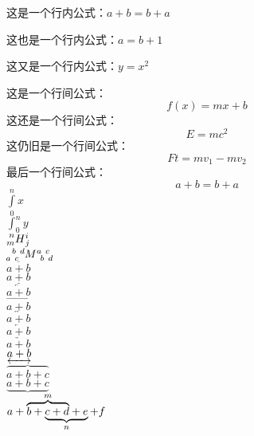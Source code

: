 \documentclass[UTF8, fontset=ubuntu]{ctexart}
\begin{document}
	这是一个行内公式：$a+b=b+a$\par
	这也是一个行内公式：\( a=b+1\)\par
	这又是一个行内公式：\begin{math}y=x^2\end{math}\par
	这是一个行间公式：$$f(x)=mx+b$$
	\indent 这还是一个行间公式：\[E=mc^2\]
	\indent 这仍旧是一个行间公式：\begin{displaymath}Ft=mv_1-mv_2\end{displaymath}
	\indent 最后一个行间公式：\begin{equation}a+b=b+a\end{equation}
	$\int\limits_0^n x$\\
	$\int\nolimits_0^n y$\\
	$\prescript{n}{m}{H}^i_j$\\
	$\tensor[_a^b_c^d]{M}{^a_b^c_d}$\\
	$\overline{a+b}$\\
	$\underline{a+b}$\\
	$\overleftarrow{a+b}$\\
	$\overrightarrow{a+b}$\\
	$\overleftrightarrow{a+b}$\\
	$\underleftarrow{a+b}$\\
	$\underrightarrow{a+b}$\\
	$\underleftrightarrow{a+b}$\\
	$\overbrace{a+b+c}$\\
	$\underbrace{a+b+c}$\\
	$a+\rlap{$\overbrace{\phantom{b+c+d}}^{m}$}b+\underbrace{c+d+e}_{n}+f$\\
\end{document}
